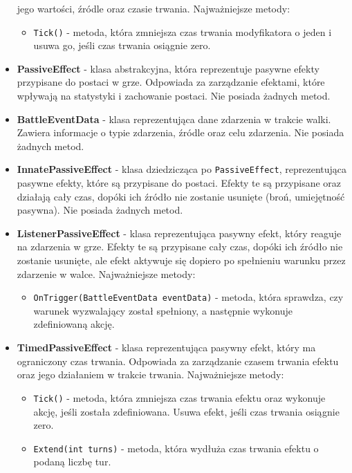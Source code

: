 \begin{itemize}
         jego wartości, źródle oraz czasie trwania. Najważniejsze metody:
            \begin{itemize}
                \item \texttt{Tick()} - metoda, która zmniejsza czas trwania modyfikatora o jeden i usuwa go, jeśli czas trwania osiągnie zero.
            \end{itemize}
        \item \textbf{PassiveEffect} - klasa abstrakcyjna, która reprezentuje pasywne efekty przypisane do postaci w grze. 
        Odpowiada za zarządzanie efektami, które wpływają na statystyki i zachowanie postaci. Nie posiada żadnych metod.
        \item \textbf{BattleEventData} - klasa reprezentująca dane zdarzenia w trakcie walki. 
        Zawiera informacje o typie zdarzenia, źródle oraz celu zdarzenia. Nie posiada żadnych metod.
        \item \textbf{InnatePassiveEffect} - klasa dziedzicząca po \texttt{PassiveEffect}, reprezentująca pasywne efekty, które są przypisane do postaci.
        Efekty te są przypisane oraz działają cały czas, dopóki ich źródło nie zostanie usunięte (broń, umiejętność pasywna). Nie posiada żadnych metod.
        \item \textbf{ListenerPassiveEffect} - klasa reprezentująca pasywny efekt, który reaguje na zdarzenia w grze. Efekty te są przypisane cały czas,
        dopóki ich źródło nie zostanie usunięte, ale efekt aktywuje się dopiero po spełnieniu warunku przez zdarzenie w walce. Najważniejsze metody:
            \begin{itemize}
                \item \texttt{OnTrigger(BattleEventData eventData)} - metoda, która sprawdza, czy warunek wyzwalający został spełniony, 
                a następnie wykonuje zdefiniowaną akcję.
            \end{itemize}
        \item \textbf{TimedPassiveEffect} - klasa reprezentująca pasywny efekt, który ma ograniczony czas trwania. 
        Odpowiada za zarządzanie czasem trwania efektu oraz jego działaniem w trakcie trwania. Najważniejsze metody:
            \begin{itemize}
                \item \texttt{Tick()} - metoda, która zmniejsza czas trwania efektu oraz wykonuje akcję, jeśli została zdefiniowana. Usuwa efekt, jeśli czas trwania osiągnie zero.
                \item \texttt{Extend(int turns)} - metoda, która wydłuża czas trwania efektu o podaną liczbę tur.

\end{itemize}
\end{itemize}
